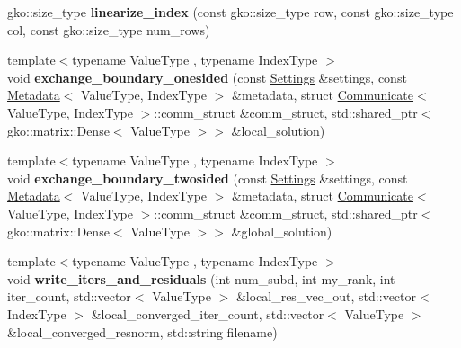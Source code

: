 \begin{DoxyCompactItemize}
\item 
\mbox{\label{namespaceschwz_a443a272fc6c66825dc7a958e824e32e3}} 
gko\+::size\+\_\+type {\bfseries linearize\+\_\+index} (const gko\+::size\+\_\+type row, const gko\+::size\+\_\+type col, const gko\+::size\+\_\+type num\+\_\+rows)
\item 
\mbox{\label{namespaceschwz_af5c4afc22eff6b40002ead1c0fc9ab39}} 
{\footnotesize template$<$typename Value\+Type , typename Index\+Type $>$ }\\void {\bfseries exchange\+\_\+boundary\+\_\+onesided} (const \hyperlink{structschwz_1_1Settings}{Settings} \&settings, const \hyperlink{structschwz_1_1Metadata}{Metadata}$<$ Value\+Type, Index\+Type $>$ \&metadata, struct \hyperlink{classschwz_1_1Communicate}{Communicate}$<$ Value\+Type, Index\+Type $>$\+::comm\+\_\+struct \&comm\+\_\+struct, std\+::shared\+\_\+ptr$<$ gko\+::matrix\+::\+Dense$<$ Value\+Type $>$$>$ \&local\+\_\+solution)
\item 
\mbox{\label{namespaceschwz_a23ebc9e79127b6bb0d6e30e55ce99bfa}} 
{\footnotesize template$<$typename Value\+Type , typename Index\+Type $>$ }\\void {\bfseries exchange\+\_\+boundary\+\_\+twosided} (const \hyperlink{structschwz_1_1Settings}{Settings} \&settings, const \hyperlink{structschwz_1_1Metadata}{Metadata}$<$ Value\+Type, Index\+Type $>$ \&metadata, struct \hyperlink{classschwz_1_1Communicate}{Communicate}$<$ Value\+Type, Index\+Type $>$\+::comm\+\_\+struct \&comm\+\_\+struct, std\+::shared\+\_\+ptr$<$ gko\+::matrix\+::\+Dense$<$ Value\+Type $>$$>$ \&global\+\_\+solution)
\item 
\mbox{\label{namespaceschwz_a031a20f3e3f7eb406d4c3c9165edc449}} 
{\footnotesize template$<$typename Value\+Type , typename Index\+Type $>$ }\\void {\bfseries write\+\_\+iters\+\_\+and\+\_\+residuals} (int num\+\_\+subd, int my\+\_\+rank, int iter\+\_\+count, std\+::vector$<$ Value\+Type $>$ \&local\+\_\+res\+\_\+vec\+\_\+out, std\+::vector$<$ Index\+Type $>$ \&local\+\_\+converged\+\_\+iter\+\_\+count, std\+::vector$<$ Value\+Type $>$ \&local\+\_\+converged\+\_\+resnorm, std\+::string filename)
\item 
\mbox{\label{namespaceschwz_aa123f4d2e7d96621d22e76cd97784701}} 

\end{DoxyCompactItemize}
